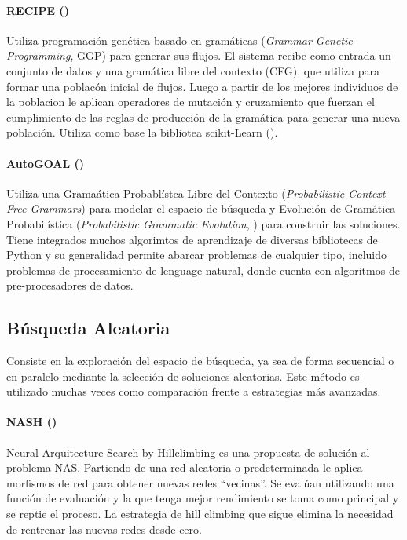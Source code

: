      \paragraph*{RECIPE (\cite{de2017recipe})} Utiliza programaci\'on gen\'etica basado en gram\'aticas (\textit{Grammar Genetic Programming}, GGP) para generar sus flujos. El sistema recibe como entrada un conjunto de datos y una gram\'atica libre del contexto (CFG), que utiliza para formar una poblac\'on inicial de flujos. Luego a partir de los mejores individuos de la poblacion le aplican operadores de mutaci\'on y cruzamiento que fuerzan el cumplimiento de las reglas de producci\'on de la gram\'atica para generar una nueva poblaci\'on. Utiliza como base la bibliotea scikit-Learn (\cite{pedregosa2011scikit}).
 

     \paragraph{AutoGOAL (\cite{estevez2020solving})} Utiliza una Grama\'atica Probabl\'istca Libre del Contexto (\textit{Probabilistic Context-Free Grammars}) para modelar el espacio de b\'usqueda y Evoluci\'on de Gram\'atica  Probabil\'istica (\textit{Probabilistic Grammatic Evolution}, \cite{megane2021probabilistic}) para construir las soluciones. Tiene integrados muchos algorimtos de aprendizaje de diversas bibliotecas de Python y su generalidad permite abarcar problemas de cualquier tipo, incluido problemas de procesamiento de lenguage natural, donde cuenta con algoritmos de pre-procesadores de datos.

\subsection{B\'usqueda Aleatoria}
Consiste en la exploraci\'on del espacio de b\'usqueda, ya sea de forma secuencial o en paralelo mediante la selecci\'on de soluciones aleatorias. Este m\'etodo es utilizado muchas veces como comparaci\'on frente a estrategias m\'as avanzadas.

\paragraph{NASH (\cite{wei2016network})} Neural Arquitecture Search by Hillclimbing es una propuesta de soluci\'on al problema NAS.
        Partiendo de una red aleatoria o predeterminada le aplica morfismos de red para obtener  nuevas redes ``vecinas''. Se eval\'uan utilizando una funci\'on de evaluaci\'on y la que tenga mejor rendimiento se toma como principal y se reptie el proceso. La estrategia de hill climbing que sigue elimina la necesidad de rentrenar las nuevas redes desde cero.

